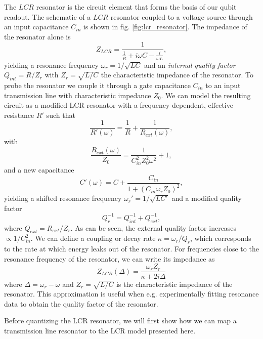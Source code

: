 The $LCR$ resonator is the circuit element that forms the basis of our qubit readout. The schematic of a $LCR$ resonator coupled to a voltage source through an input capacitance $C_{in}$ is  shown in fig. \ref{fig:lcr_resonator}. The impedance of the resonator alone is
%
\begin{equation}
Z_{LCR} = \frac{1}{\frac{1}{R}+i\omega C - \frac{i}{\omega L}},
\end{equation}
%
yielding a resonance frequency $\omega_r = 1/\sqrt{LC}$ and an {\it internal quality factor} $Q_{int} = R/Z_r$ with $Z_r=\sqrt{L/C}$ the characteristic impedance of the resonator. To probe the resonator we couple it through a gate capacitance $C_{in}$ to an input transmission line with characteristic impedance $Z_0$. We can model the resulting circuit as a modified LCR resonator with a frequency-dependent, effective resistance $R'$ such that
%
\begin{equation}
\frac{1}{R'(\omega)} = \frac{1}{R}+\frac{1}{R_{ext}(\omega)},
\end{equation}
%
with
%
\begin{equation}
\frac{R_{ext}(\omega)}{Z_0} = \frac{1}{C_{in}^2 Z_0^2 \omega^2}+1,
\end{equation}
%
and a new capacitance 
%
\begin{equation}
C'(\omega) = C+\frac{C_{in}}{1+(C_{in}\omega_r Z_0)^2},
\end{equation}
%
yielding a shifted resonance frequency $\omega_{r}'=1/\sqrt{LC'}$ and a modified quality factor
%
\begin{equation}
Q_r^{-1} = Q^{-1}_{int}+Q^{-1}_{ext},
\end{equation}
%
where $Q_{ext} = R_{ext}/Z_r$. As can be seen, the external quality factor increases $\propto 1 / C_{in}^2$. We can define a coupling or decay rate $\kappa=\omega_r/Q_r$, which corresponds to the rate at which energy leaks out of the resonator. For frequencies close to the resonance frequency of the resonator, we can write its impedance as
%
\begin{equation}
Z_{LCR}(\Delta) = \frac{\omega_r Z_r}{\kappa+2i\Delta} \label{eq:lcr_lorentzian}
\end{equation}
%
where $\Delta = \omega_r-\omega$ and $Z_r = \sqrt{L/C}$ is the characteristic impedance of the resonator. This approximation is useful when e.g. experimentally fitting resonance data to obtain the quality factor of the resonator.

\smallskip

Before quantizing the LCR resonator, we will first show how we can map a transmission line resonator to the LCR model presented here.

